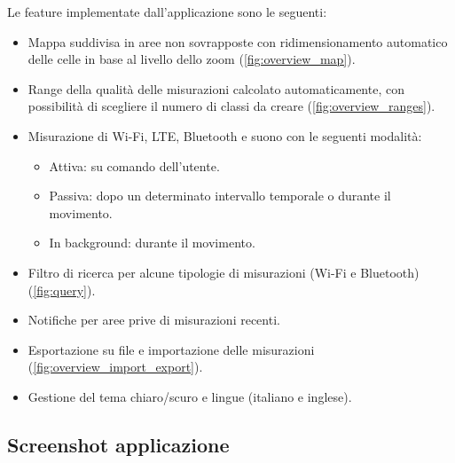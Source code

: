 \documentclass[11pt]{article}
\begin{document}
Le feature implementate dall'applicazione sono le seguenti:
\begin{itemize}
    \item Mappa suddivisa in aree non sovrapposte con ridimensionamento automatico delle celle in base al livello dello zoom (\cref{fig:overview_map}).
    \item Range della qualità delle misurazioni calcolato automaticamente, con possibilità di scegliere il numero di classi da creare (\cref{fig:overview_ranges}).
    \item Misurazione di Wi-Fi, LTE, Bluetooth e suono con le seguenti modalità:
    \begin{itemize}[topsep=0pt]
        \item Attiva: su comando dell'utente.
        \item Passiva: dopo un determinato intervallo temporale o durante il movimento. 
        \item In background: durante il movimento.
    \end{itemize}
    \item Filtro di ricerca per alcune tipologie di misurazioni (Wi-Fi e Bluetooth) (\cref{fig:query}).
    \item Notifiche per aree prive di misurazioni recenti.
    \item Esportazione su file e importazione delle misurazioni (\cref{fig:overview_import_export}).
    \item Gestione del tema chiaro/scuro e lingue (italiano e inglese).
\end{itemize}


\subsection{Screenshot applicazione}
\end{document}
